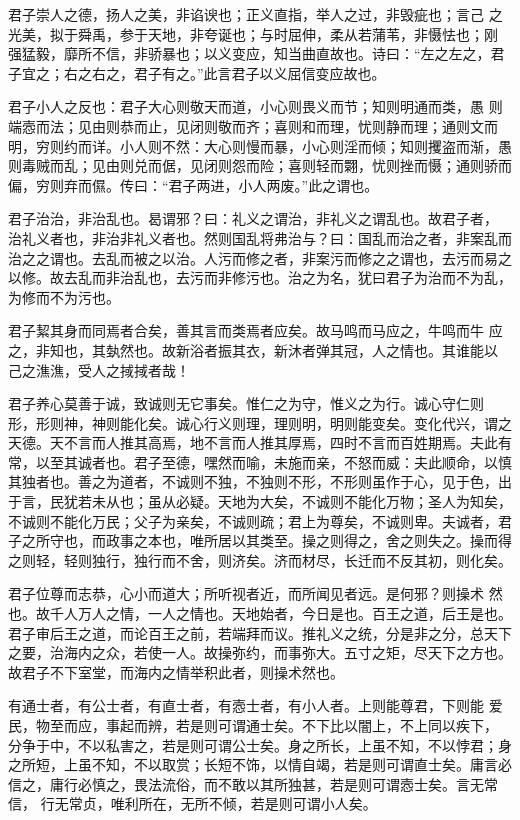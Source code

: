 \documentclass[]{article}
\begin{document}
君子崇人之德，扬人之美，非谄谀也；正义直指，举人之过，非毁疵也；言己
之光美，拟于舜禹，参于天地，非夸诞也；与时屈伸，柔从若蒲苇，非慑怯也；刚
强猛毅，靡所不信，非骄暴也；以义变应，知当曲直故也。诗曰：``左之左之，君
子宜之；右之右之，君子有之。''此言君子以义屈信变应故也。

君子小人之反也：君子大心则敬天而道，小心则畏义而节；知则明通而类，愚
则端悫而法；见由则恭而止，见闭则敬而齐；喜则和而理，忧则静而理；通则文而
明，穷则约而详。小人则不然：大心则慢而暴，小心则淫而倾；知则攫盗而渐，愚
则毒贼而乱；见由则兑而倨，见闭则怨而险；喜则轻而翾，忧则挫而慑；通则骄而
偏，穷则弃而儑。传曰：``君子两进，小人两废。''此之谓也。

君子治治，非治乱也。曷谓邪？曰：礼义之谓治，非礼义之谓乱也。故君子者，
治礼义者也，非治非礼义者也。然则国乱将弗治与？曰：国乱而治之者，非案乱而
治之之谓也。去乱而被之以治。人污而修之者，非案污而修之之谓也，去污而易之
以修。故去乱而非治乱也，去污而非修污也。治之为名，犹曰君子为治而不为乱，
为修而不为污也。

君子絜其身而同焉者合矣，善其言而类焉者应矣。故马鸣而马应之，牛鸣而牛
应之，非知也，其埶然也。故新浴者振其衣，新沐者弹其冠，人之情也。其谁能以
己之潐潐，受人之掝掝者哉！

君子养心莫善于诚，致诚则无它事矣。惟仁之为守，惟义之为行。诚心守仁则
形，形则神，神则能化矣。诚心行义则理，理则明，明则能变矣。变化代兴，谓之
天德。天不言而人推其高焉，地不言而人推其厚焉，四时不言而百姓期焉。夫此有
常，以至其诚者也。君子至德，嘿然而喻，未施而亲，不怒而威：夫此顺命，以慎
其独者也。善之为道者，不诚则不独，不独则不形，不形则虽作于心，见于色，出
于言，民犹若未从也；虽从必疑。天地为大矣，不诚则不能化万物；圣人为知矣，
不诚则不能化万民；父子为亲矣，不诚则疏；君上为尊矣，不诚则卑。夫诚者，君
子之所守也，而政事之本也，唯所居以其类至。操之则得之，舍之则失之。操而得
之则轻，轻则独行，独行而不舍，则济矣。济而材尽，长迁而不反其初，则化矣。

君子位尊而志恭，心小而道大；所听视者近，而所闻见者远。是何邪？则操术
然也。故千人万人之情，一人之情也。天地始者，今日是也。百王之道，后王是也。
君子审后王之道，而论百王之前，若端拜而议。推礼义之统，分是非之分，总天下
之要，治海内之众，若使一人。故操弥约，而事弥大。五寸之矩，尽天下之方也。
故君子不下室堂，而海内之情举积此者，则操术然也。

有通士者，有公士者，有直士者，有悫士者，有小人者。上则能尊君，下则能
爱民，物至而应，事起而辨，若是则可谓通士矣。不下比以闇上，不上同以疾下，
分争于中，不以私害之，若是则可谓公士矣。身之所长，上虽不知，不以悖君；身
之所短，上虽不知，不以取赏；长短不饰，以情自竭，若是则可谓直士矣。庸言必
信之，庸行必慎之，畏法流俗，而不敢以其所独甚，若是则可谓悫士矣。言无常信，
行无常贞，唯利所在，无所不倾，若是则可谓小人矣。
\end{document}
